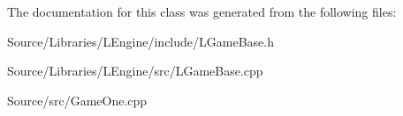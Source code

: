 The documentation for this class was generated from the following files\-:\begin{DoxyCompactItemize}
\item 
Source/\-Libraries/\-L\-Engine/include/L\-Game\-Base.\-h\item 
Source/\-Libraries/\-L\-Engine/src/L\-Game\-Base.\-cpp\item 
Source/src/Game\-One.\-cpp\end{DoxyCompactItemize}
